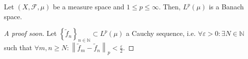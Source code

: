 \begin{frame}
	\begin{theorem}
		Let $\left(X,\mathcal{F},\mu\right)$ be a measure space and
		$1\leq p\leq\infty$.
		Then, $L^{p}\left(\mu\right)$ is a Banach space.
	\end{theorem}

	\begin{proof}[\alert{A proof soon}]
		Let
		\begin{math}
			{\left\{\widetilde{f}_{n}\right\}}_{n\in\mathds{N}}\subset
			L^{p}\left(\mu\right)
		\end{math}
		a Cauchy sequence, i.e.
		\begin{math}
			\forall\varepsilon>0:
			\exists N\in\mathds{N}
		\end{math}
		such that
		\begin{math}
			\forall m,n\geq N:
			{\left\|\widetilde{f}_{m}-\widetilde{f}_{n}\right\|}_{p}<
			\frac{\varepsilon}{2}
		\end{math}.



	\end{proof}

\end{frame}